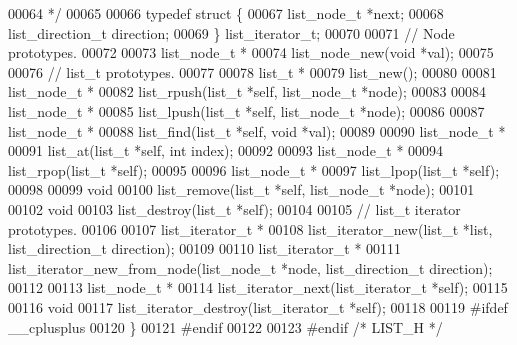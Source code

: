 \begin{DoxyCode}
00064 \textcolor{comment}{ */}
00065 
00066 \textcolor{keyword}{typedef} \textcolor{keyword}{struct }\{
00067   list_node_t *next;
00068   list\_direction\_t direction;
00069 \} list_iterator_t;
00070 
00071 \textcolor{comment}{// Node prototypes.}
00072 
00073 list_node_t *
00074 list_node_new(\textcolor{keywordtype}{void} *val);
00075 
00076 \textcolor{comment}{// list\_t prototypes.}
00077 
00078 list_t *
00079 list_new();
00080 
00081 list_node_t *
00082 list_rpush(list_t *\textcolor{keyword}{self}, list_node_t *node);
00083 
00084 list_node_t *
00085 list_lpush(list_t *\textcolor{keyword}{self}, list_node_t *node);
00086 
00087 list_node_t *
00088 list_find(list_t *\textcolor{keyword}{self}, \textcolor{keywordtype}{void} *val);
00089 
00090 list_node_t *
00091 list_at(list_t *\textcolor{keyword}{self}, \textcolor{keywordtype}{int} index);
00092 
00093 list_node_t *
00094 list_rpop(list_t *\textcolor{keyword}{self});
00095 
00096 list_node_t *
00097 list_lpop(list_t *\textcolor{keyword}{self});
00098 
00099 \textcolor{keywordtype}{void}
00100 list_remove(list_t *\textcolor{keyword}{self}, list_node_t *node);
00101 
00102 \textcolor{keywordtype}{void}
00103 list_destroy(list_t *\textcolor{keyword}{self});
00104 
00105 \textcolor{comment}{// list\_t iterator prototypes.}
00106 
00107 list_iterator_t *
00108 list_iterator_new(list_t *list, list\_direction\_t direction);
00109 
00110 list_iterator_t *
00111 list_iterator_new_from_node(list_node_t *node, list\_direction\_t direction);
00112 
00113 list_node_t *
00114 list_iterator_next(list_iterator_t *\textcolor{keyword}{self});
00115 
00116 \textcolor{keywordtype}{void}
00117 list_iterator_destroy(list_iterator_t *\textcolor{keyword}{self});
00118 
00119 \textcolor{preprocessor}{#ifdef \_\_cplusplus}
00120 \}
00121 \textcolor{preprocessor}{#endif}
00122 
00123 \textcolor{preprocessor}{#endif }\textcolor{comment}{/* LIST\_H */}\textcolor{preprocessor}{}
\end{DoxyCode}
